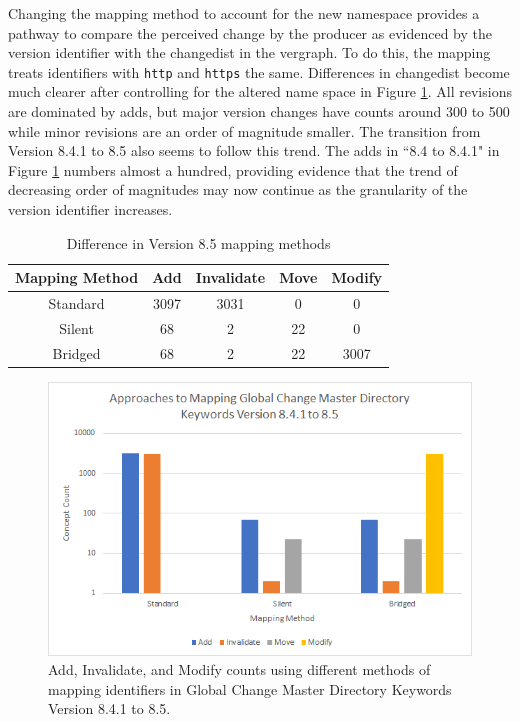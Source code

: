 Changing the mapping method to account for the new namespace provides a pathway to compare the perceived change by the producer as evidenced by the version identifier with the \gls{changedist} in the \gls{vergraph}.
To do this, the mapping treats identifiers with \texttt{http} and \texttt{https} the same. 
Differences in \gls{changedist} become much clearer after controlling for the altered name space in Figure \ref{GCMDC2}.
All revisions are dominated by \glspl{add}, but major version changes have counts around 300 to 500 while minor revisions are an order of magnitude smaller.
The transition from Version 8.4.1 to 8.5 also seems to follow this trend.
The \glspl{add} in ``8.4 to 8.4.1" in Figure \ref{GCMDC2} numbers almost a hundred, providing evidence that the trend of decreasing order of magnitudes may now continue as the granularity of the version identifier increases.

\begin{table}
	\caption{Difference in Version 8.5 mapping methods}
	\label{table:GCMD_8_5}
	\centering
	\begin{tabular}{|c|c|c|c|c|}
		\hline
		Mapping Method&	Add&	Invalidate&	Move&	Modify\\ \hline
		Standard&	3097&	3031&	0&	0\\
		Silent&	68&	2&	22&	0\\
		Bridged&	68&	2&	22&	3007\\		
		\hline
	\end{tabular}
\end{table}
\begin{figure}%
	\centering
	\includegraphics[scale=.9]{figures/GCMD8_5.png}
	\caption{Add, Invalidate, and Modify counts using different methods of mapping identifiers in Global Change Master Directory Keywords Version 8.4.1 to 8.5.}
	\label{GCMDC2}
\end{figure}


